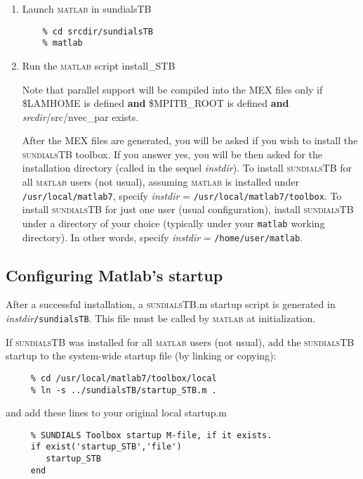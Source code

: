 \documentclass[titlepage,10pt]{article}
\newcommand{\sundialsTB}{{\normalfont\scshape sundialsTB}}
\newcommand{\matlab}{{\normalfont\scshape matlab}}
\begin{document}
\begin{enumerate}

\item Launch {\matlab} in sundialsTB
\begin{verbatim}
    % cd srcdir/sundialsTB
    % matlab
\end{verbatim}

\item Run the {\matlab} script install\_STB 

     Note that parallel support will be compiled into the MEX files only if
     \$LAMHOME is defined {\bf and}
     \$MPITB\_ROOT is defined {\bf and}
     {\em srcdir}/src/nvec\_par exists.

     After the MEX files are generated, you will be asked if you wish to install 
     the {\sundialsTB} toolbox. If you answer yes, you will be then asked for the
     installation directory (called in the sequel {\em instdir}). 
     To install {\sundialsTB} for all {\matlab} users (not usual), assuming {\matlab} is 
     installed under {\tt /usr/local/matlab7}, specify
        {\em instdir} = {\tt /usr/local/matlab7/toolbox}.
     To install {\sundialsTB} for just one user (usual configuration), install      
     {\sundialsTB} under a directory of your choice (typically under your {\tt matlab}
     working directory). In other words, specify
        {\em instdir} = {\tt /home/user/matlab}.

\end{enumerate}

\subsection{Configuring Matlab's startup}

After a successful installation, a {\sundialsTB}.m startup script is generated
in {\em instdir}{\tt /sundialsTB}. This file must be called by {\matlab} at initialization.

If {\sundialsTB} was installed for all {\matlab} users (not usual), add the {\sundialsTB} 
startup to the system-wide startup file (by linking or copying):

\begin{verbatim}
     % cd /usr/local/matlab7/toolbox/local
     % ln -s ../sundialsTB/startup_STB.m .
\end{verbatim}

and add these lines to your original local startup.m

\begin{verbatim}
     % SUNDIALS Toolbox startup M-file, if it exists.
     if exist('startup_STB','file')
        startup_STB
     end
\end{verbatim}
\end{document}
